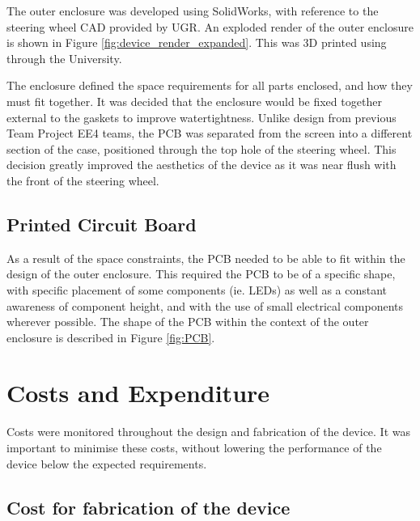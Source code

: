 \documentclass[a4paper,12pt]{article}
\begin{document}
The outer enclosure was developed using SolidWorks, with reference to the steering wheel CAD provided by UGR. An exploded render of the outer enclosure is shown in Figure \ref{fig:device_render_expanded}. This was 3D printed using through the University.



The enclosure defined the space requirements for all parts enclosed, and how they must fit together. It was decided that the enclosure would be fixed together external to the gaskets to improve watertightness. Unlike design from previous Team Project EE4 teams, the PCB was separated from the screen into a different section of the case, positioned through the top hole of the steering wheel. This decision greatly improved the aesthetics of the device as it was near flush with the front of the steering wheel.

\subsection{Printed Circuit Board}
\label{sec:printed_circuit_board}

As a result of the space constraints, the PCB needed to be able to fit within the design of the outer enclosure. This required the PCB to be of a specific shape, with specific placement of some components (ie. LEDs) as well as a constant awareness of component height, and with the use of small electrical components wherever possible. The shape of the PCB within the context of the outer enclosure is described in Figure \ref{fig:PCB}.




\newpage
\section{Costs and Expenditure}
\label{sec:cost}

Costs were monitored throughout the design and fabrication of the device. It was important to minimise these costs, without lowering the performance of the device below the expected requirements.

\subsection{Cost for fabrication of the device}
\label{sec:device_cost}
\end{document}
